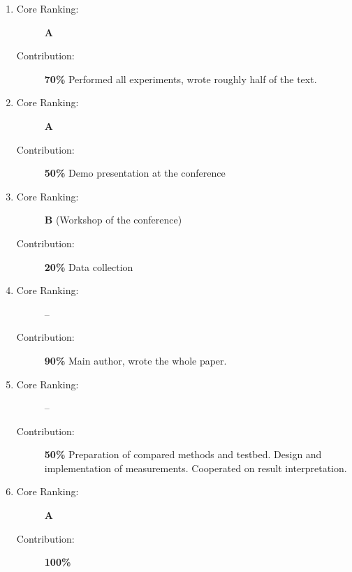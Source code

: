 \begin{enumerate}
  \item {}
  \begin{description}
    \item[Core Ranking:] \textbf{A}
    \item[Contribution:] \textbf{70\%} Performed all experiments, wrote roughly half of the text.
  \end{description}
  
  \item {}
  \begin{description}
    \item[Core Ranking:] \textbf{A}
    \item[Contribution:] \textbf{50\%} Demo presentation at the conference
  \end{description}
  
  \item {}
  \begin{description}
    \item[Core Ranking:] \textbf{B} (Workshop of the conference)
    \item[Contribution:] \textbf{20\%} Data collection
  \end{description}
  
  \item {}
  \begin{description}
    \item[Core Ranking:] --
    \item[Contribution:] \textbf{90\%} Main author, wrote the whole paper.
  \end{description}
  
  \item {}
  \begin{description}
    \item[Core Ranking:] --
    \item[Contribution:] \textbf{50\%} Preparation of compared methods and testbed. Design and implementation of measurements. Cooperated on result interpretation.
  \end{description}
  
  \item {}
  \begin{description}
    \item[Core Ranking:] \textbf{A}
    \item[Contribution:] \textbf{100\%}
  \end{description}
  

\end{enumerate}

